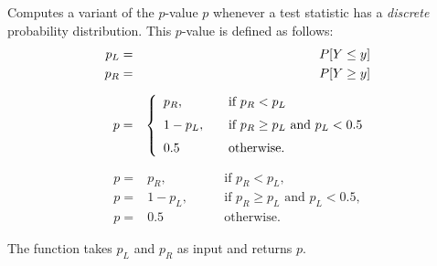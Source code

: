 \begin{tabb}  Computes a variant of the $p$-value $p$ whenever a test statistic
  has a {\em discrete\/} probability distribution.
  This $p$-value is defined as follows:
  \begin{eqnarray*}
    p_L & = & P[Y \le y] \\
    p_R & = & P[Y \ge y] \\[6pt]
    p & = & \left\{ \begin{array}{l@{\qquad}l}
        p_R, & \mbox{if } p_R <  p_L \\[6pt]
     1 - p_L, & \mbox{if }
            p_R \ge p_L \mbox{ and }  p_L < 0.5 \\[6pt]
              0.5  &         \mbox{otherwise.}
                    \end{array}  \right.
  \end{eqnarray*}
\begin{htmlonly}
  \[\begin{array}{rll}
   p =& p_R, &\qquad\mbox{if } p_R < p_L, \\
   p =& 1 - p_L, &\qquad\mbox{if } p_R \ge p_L \mbox{ and } p_L < 0.5, \\
   p =& 0.5 &\qquad\mbox{otherwise.}
 \end{array} \]
\end{htmlonly}
  The function takes $p_L$ and $p_R$ as input and returns $p$.
\end{tabb}
\begin{htmlonly}
\end{htmlonly}
